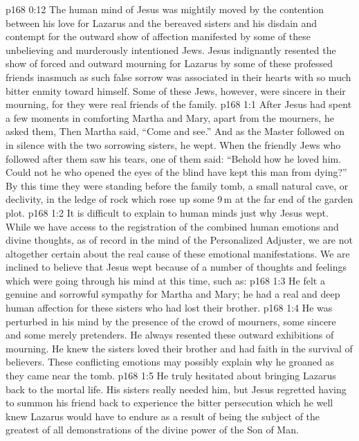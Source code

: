 \vs p168 0:12 The human mind of Jesus was mightily moved by the contention between his love for Lazarus and the bereaved sisters and his disdain and contempt for the outward show of affection manifested by some of these unbelieving and murderously intentioned Jews. Jesus indignantly resented the show of forced and outward mourning for Lazarus by some of these professed friends inasmuch as such false sorrow was associated in their hearts with so much bitter enmity toward himself. Some of these Jews, however, were sincere in their mourning, for they were real friends of the family.
\vs p168 1:1 After Jesus had spent a few moments in comforting Martha and Mary, apart from the mourners, he asked them,  Then Martha said, “Come and see.” And as the Master followed on in silence with the two sorrowing sisters, he wept. When the friendly Jews who followed after them saw his tears, one of them said: “Behold how he loved him. Could not he who opened the eyes of the blind have kept this man from dying?” By this time they were standing before the family tomb, a small natural cave, or declivity, in the ledge of rock which rose up some 9\,m at the far end of the garden plot.
\vs p168 1:2 \pc It is difficult to explain to human minds just why Jesus wept. While we have access to the registration of the combined human emotions and divine thoughts, as of record in the mind of the Personalized Adjuster, we are not altogether certain about the real cause of these emotional manifestations. We are inclined to believe that Jesus wept because of a number of thoughts and feelings which were going through his mind at this time, such as:
\vs p168 1:3 \bibnobreakspace He felt a genuine and sorrowful sympathy for Martha and Mary; he had a real and deep human affection for these sisters who had lost their brother.
\vs p168 1:4 \bibnobreakspace He was perturbed in his mind by the presence of the crowd of mourners, some sincere and some merely pretenders. He always resented these outward exhibitions of mourning. He knew the sisters loved their brother and had faith in the survival of believers. These conflicting emotions may possibly explain why he groaned as they came near the tomb.
\vs p168 1:5 \bibnobreakspace He truly hesitated about bringing Lazarus back to the mortal life. His sisters really needed him, but Jesus regretted having to summon his friend back to experience the bitter persecution which he well knew Lazarus would have to endure as a result of being the subject of the greatest of all demonstrations of the divine power of the Son of Man.

